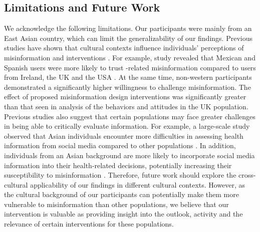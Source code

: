 \subsection{Limitations and Future Work}
We acknowledge the following limitations. 
Our participants were mainly from an East Asian country, which can limit the generalizability of our findings. Previous studies have shown that cultural contexts influence individuals' perceptions of misinformation and interventions \cite{noman2024designing}. For example, study revealed that Mexican and Spanish users were more likely to trust -related misinformation compared to users from Ireland, the UK and the USA \cite{roozenbeek2020susceptibility}. At the same time, non-western participants demonstrated a significantly higher willingness to challenge misinformation. The effect of proposed misinformation design interventions was significantly greater than that seen in analysis of the behaviors and attitudes in the UK population\cite{noman2024designing}. 
Previous studies also suggest that certain populations may face greater challenges in being able to critically evaluate information. For example, a large-scale study observed that Asian individuals encounter more difficulties in assessing health information from social media compared to other populations \cite{chandrasekaran2024racial}. 
In addition, individuals from an Asian background are more likely to incorporate social media information into their health-related decisions, potentially increasing their susceptibility to misinformation \cite{chandrasekaran2024racial}. Therefore, future work should explore the cross-cultural applicability of our findings in different cultural contexts. However, as the cultural background of our participants can potentially make them more vulnerable to misinformation than other populations, we believe that our intervention is valuable as providing insight into the outlook, activity and the relevance of certain interventions for these populations.

